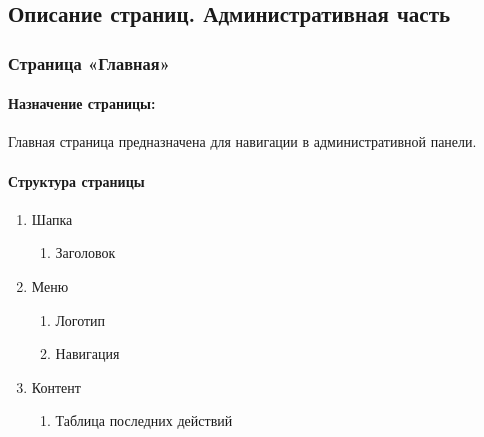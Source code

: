 \subsection{Описание страниц. Административная часть}
\subsubsection{Страница «Главная»}
\paragraph{Назначение страницы:}
Главная страница предназначена для навигации в административной панели.

\paragraph{Структура страницы}
\begin{enumerate}
	\item Шапка
	\begin{enumerate}
		\item Заголовок
	\end{enumerate}

	\item Меню
	\begin{enumerate}
		\item  Логотип
		\item  Навигация
	\end{enumerate}

	\item  Контент
	\begin{enumerate}
		\item  Таблица последних действий
	\end{enumerate}
\end{enumerate}

